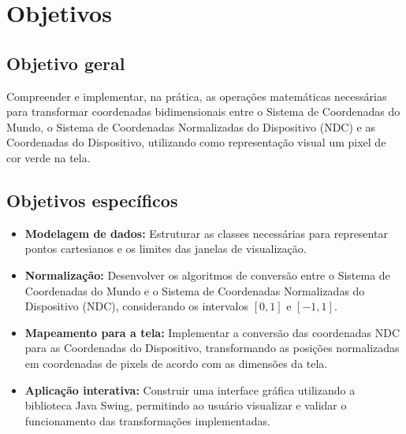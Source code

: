 \section{Objetivos}
\label{sec:objetivos}

\subsection{Objetivo geral}
Compreender e implementar, na prática, as operações matemáticas necessárias para transformar coordenadas bidimensionais entre o Sistema de Coordenadas do Mundo, o Sistema de Coordenadas Normalizadas do Dispositivo (NDC) e as Coordenadas do Dispositivo, utilizando como representação visual um pixel de cor verde na tela.

\subsection{Objetivos específicos}
\begin{itemize}
    \item \textbf{Modelagem de dados:} Estruturar as classes necessárias para representar pontos cartesianos e os limites das janelas de visualização.
    \item \textbf{Normalização:} Desenvolver os algoritmos de conversão entre o Sistema de Coordenadas do Mundo e o Sistema de Coordenadas Normalizadas do Dispositivo (NDC), considerando os intervalos $[0,1]$ e $[-1,1]$.
    \item \textbf{Mapeamento para a tela:} Implementar a conversão das coordenadas NDC para as Coordenadas do Dispositivo, transformando as posições normalizadas em coordenadas de pixels de acordo com as dimensões da tela.
    \item \textbf{Aplicação interativa:} Construir uma interface gráfica utilizando a biblioteca Java Swing, permitindo ao usuário visualizar e validar o funcionamento das transformações implementadas.
\end{itemize}
